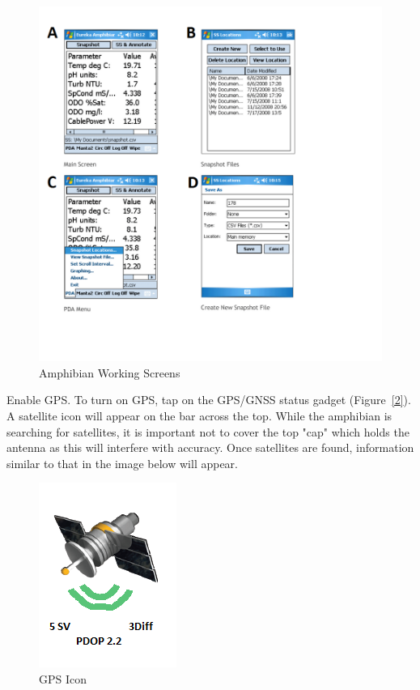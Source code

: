 \documentclass[12pt]{../SOP3}\usepackage[]{graphicx}\usepackage[]{color}
\begin{document}
\begin{figure}[h]
\centering
\includegraphics[scale=0.6]{AmphibianMain.png}
\caption{Amphibian Working Screens}
\label{fig:AmphibianMain.png}
\end{figure}

\NP Enable GPS. To turn on GPS, tap on the GPS/GNSS status gadget (Figure~\ref{2}). A satellite icon will appear on the bar across the top. While the amphibian is searching for satellites, it is important not to cover the top "cap" which holds the antenna as this will interfere with accuracy. Once satellites are found, information similar to that in the image below will appear.

\begin{figure}[h]
\centering
\includegraphics{GPS.png}
\caption{GPS Icon}
\label{GPS.png}
\end{figure}
\end{document}
